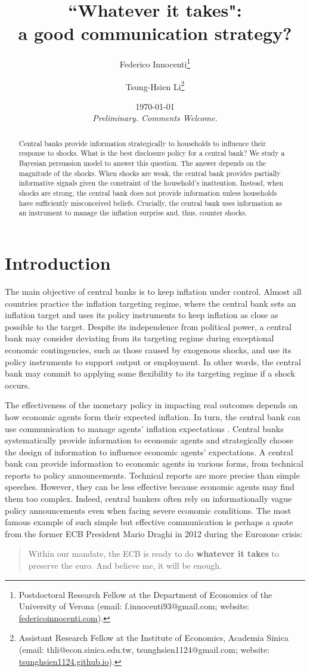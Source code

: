 \documentclass[12pt,a4paper]{article}
\title{``Whatever it takes": \\ a good communication strategy?}
\author{Federico Innocenti\thanks{Postdoctoral Research Fellow at the Department of Economics of the University of Verona (email: f.innocenti93@gmail.com; website: \href{https://federicoinnocenti.com/}{federicoinnocenti.com}).} \and Tsung-Hsien Li\thanks{Assistant Research Fellow at the Institute of Economics, Academia Sinica (email: thli@econ.sinica.edu.tw, tsunghsien1124@gmail.com; website: \href{https://tsunghsien1124.github.io/}{tsunghsien1124.github.io}).}}
\date{\today \\ \medskip
\emph{Preliminary. Comments Welcome.}}
\begin{document}
\setlength{\parskip}{2mm}

\maketitle

\begin{abstract}
Central banks provide information strategically to households to influence their response to shocks. What is the best disclosure policy for a central bank? We study a Bayesian persuasion model to answer this question. The answer depends on the magnitude of the shocks. When shocks are weak, the central bank provides partially informative signals given the constraint of the household's inattention. Instead, when shocks are strong, the central bank does not provide information unless households have sufficiently misconceived beliefs. Crucially, the central bank uses information as an instrument to manage the inflation surprise and, thus, counter shocks. 
\end{abstract}

\newpage

\section{Introduction} \label{sec:intro}

The main objective of central banks is to keep inflation under control. Almost all countries practice the inflation targeting regime, where the central bank sets an inflation target and uses its policy instruments to keep inflation as close as possible to the target. Despite its independence from political power, a central bank may consider deviating from its targeting regime during exceptional economic contingencies, such as those caused by exogenous shocks, and use its policy instruments to support output or employment. In other words, the central bank may commit to applying some flexibility to its targeting regime if a shock occurs. 

The effectiveness of the monetary policy in impacting real outcomes depends on how economic agents form their expected inflation. In turn, the central bank can use communication to manage agents' inflation expectations \citep{Casiraghi2022}.  
Central banks systematically provide information to economic agents and strategically choose the design of information to influence economic agents' expectations. 
A central bank can provide information to economic agents in various forms, from technical reports to policy announcements. Technical reports
are more precise than simple speeches. However, they can be less effective because economic agents may find them too complex. Indeed, central bankers often rely on informationally vague policy announcements even when facing severe economic conditions.
The most famous example of such simple but effective communication is perhaps a quote from the former ECB President Mario Draghi in 2012 during the Eurozone crisis:
\begin{quote}
Within our mandate, the ECB is ready to do \textbf{whatever it takes} to preserve the euro. And believe me, it will be enough.
\end{quote}
\end{document}
